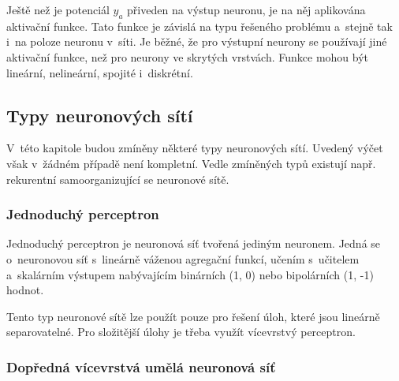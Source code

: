 \documentclass[a4paper,12pt]{article}
\begin{document}
{{{{Ještě než je potenciál $y_a$ přiveden na výstup neuronu, je na něj aplikována aktivační funkce. Tato funkce je závislá na typu řešeného problému a~stejně tak i~na poloze neuronu v~síti. Je běžné, že pro výstupní neurony se používají jiné aktivační funkce, než pro neurony ve skrytých vrstvách. Funkce mohou být lineární, nelineární, spojité i~diskrétní.~\cite{nn}





\vspace{-20pt}

\subsection{Typy neuronových sítí}

V~této kapitole budou zmíněny některé typy neuronových sítí. Uvedený výčet však v~žádném případě není kompletní. Vedle zmíněných typů existují např. rekurentní samoorganizující se neuronové sítě.

\vspace{-10pt}

\subsubsection{Jednoduchý perceptron}

Jednoduchý perceptron je neuronová síť tvořená jediným neuronem. Jedná se o~neuronovou síť s~lineárně váženou agregační funkcí, učením s~učitelem a~skalárním výstupem nabývajícím binárních (1, 0) nebo bipolárních (1, -1) hodnot.~\cite{nn}

\vspace{-10pt}


Tento typ neuronové sítě lze použít pouze pro řešení úloh, které jsou lineárně separovatelné. Pro složitější úlohy je třeba využít vícevrstvý perceptron.~\cite{nn}

\subsubsection{Dopředná vícevrstvá umělá neuronová síť}

}}}}
\end{document}
